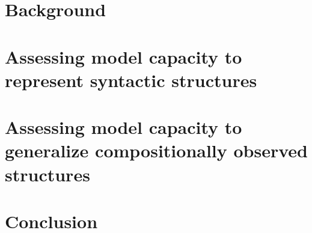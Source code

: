 \documentclass[12pt,oneside]{book} %
\begin{document}
\newcommand{\bcomment}[2]{ {\color{red} #1}  {\color{blue} #2}}
\newcommand{\bingzhi}[1]{\textcolor{teal}{#1}}

\newcommand{\alert}[1]{\textcolor{blue}{\textbf{#1}}}
\newcommand{\cue}{\textbf{cue}\xspace}
\newcommand{\target}{\textbf{target}\xspace}
\newcommand{\exactmatch}[1]{{\textcolor{gray}{#1}}}
\newcommand{\citeti}[1]{\citep[\textcolor{gray}{; i.a.}]{#1}}
\newcommand{\ivec}[1]{{\mathbf #1}} %



\part{Background}


\part{Assessing model capacity to represent syntactic structures }



\part{Assessing model capacity to generalize compositionally observed structures }

\part{Conclusion}







 



\end{document}
